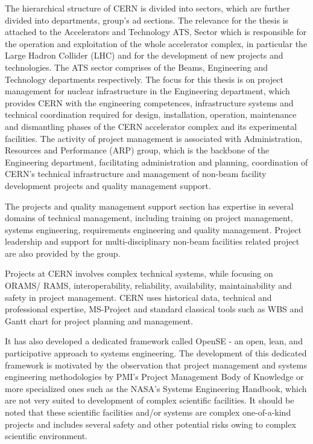 The hierarchical structure of CERN is divided into sectors, which are further divided into departments, group's ad sections. The relevance for the thesis is attached to the Accelerators and Technology ATS, Sector which is responsible for the operation and exploitation of the whole accelerator complex, in particular the Large Hadron Collider (LHC) and for the development of new projects and technologies. The ATS sector comprises of the Beams, Engineering and Technology departments respectively. The focus for this thesis is on project management for nuclear infrastructure in the Engineering department, which provides CERN with the engineering competences, infrastructure systems and technical coordination required for design, installation, operation, maintenance and dismantling phases of the CERN accelerator complex and its experimental facilities. The activity of project management is associated with Administration, Resources and Performance (ARP) group, which is the backbone of the Engineering department, facilitating administration and planning, coordination of CERN's technical infrastructure and management of non-beam facility development projects and quality management support.


The projects and quality management support section has expertise in several domains of technical management, including training on project management, systems engineering, requirements engineering and quality management. Project leadership and support for multi-disciplinary non-beam facilities related project are also provided by the group.

Projects at CERN involves complex technical systems, while focusing on ORAMS/ RAMS, interoperability, reliability, availability, maintainability and safety in project management. CERN uses historical data, technical and professional expertise, MS-Project and standard classical tools such as WBS and Gantt chart for project planning and management. 

It has also developed a dedicated framework called OpenSE - an open, lean, and participative approach to systems engineering. The development of this dedicated framework is motivated by the observation that project management and systems engineering methodologies by PMI's Project Management Body of Knowledge or more specialized ones such as the NASA's Systems Engineering Handbook, which are not very suited to development of complex scientific facilities. It should be noted that these scientific facilities and/or systems are complex one-of-a-kind projects and includes several safety and other potential risks owing to complex scientific environment. 

